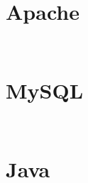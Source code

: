 \begin{lstlisting}[language=bash]

\end{lstlisting}





\begin{lstlisting}[language=bash]

\end{lstlisting}

\section{Apache}


\begin{lstlisting}[language=bash]

\end{lstlisting}




\begin{lstlisting}[language=bash]

\end{lstlisting}


\section{MySQL}


\begin{lstlisting}[language=bash]

\end{lstlisting}




\begin{lstlisting}[language=bash]

\end{lstlisting}


\section{Java}



\begin{lstlisting}[language=bash]

\end{lstlisting}




\begin{lstlisting}[language=bash]

\end{lstlisting}


